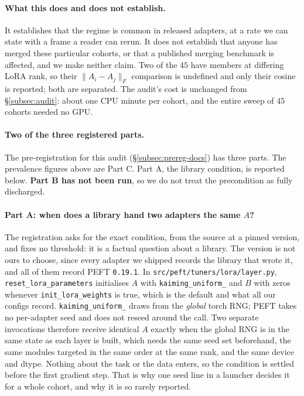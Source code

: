 \paragraph{What this does and does not establish.} It establishes that the
regime is common in released adapters, at a rate we can state with a frame a
reader can rerun. It does not establish that anyone has merged these particular
cohorts, or that a published merging benchmark is affected, and we make neither
claim. Two of the $45$ have members at differing LoRA rank, so their
$\|A_i - A_j\|_F$ comparison is undefined and only their cosine is reported;
both are separated. The audit's cost is unchanged from
\S\ref{subsec:audit}: about one CPU minute per cohort, and the entire sweep of
$45$ cohorts needed no GPU.

\paragraph{Two of the three registered parts.} The
pre-registration for this audit (\S\ref{subsec:prereg-docs}) has three parts.
The prevalence figures above are Part C. Part A, the library condition, is
reported below. \textbf{Part B has not been run}, so we do not treat the
precondition as fully discharged.

\paragraph{Part A: when does a library hand two adapters the same $A$?} The
registration asks for the exact condition, from the source at a pinned
version, and fixes no threshold: it is a factual question about a library. The
version is not ours to choose, since every adapter we shipped records the
library that wrote it, and all of them record PEFT \texttt{0.19.1}. In
\texttt{src/peft/tuners/lora/layer.py}, \texttt{reset\_lora\_parameters}
initialises $A$ with \texttt{kaiming\_uniform\_} and $B$ with zeros whenever
\texttt{init\_lora\_weights} is true, which is the default and what all our
configs record. \texttt{kaiming\_uniform\_} draws from the \emph{global} torch
RNG; PEFT takes no per-adapter seed and does not reseed around the call. Two
separate invocations therefore receive identical $A$ exactly when the global
RNG is in the same state as each layer is built, which needs the same seed set
beforehand, the same modules targeted in the same order at the same rank, and
the same device and dtype. Nothing about the task or the data enters, so the
condition is settled before the first gradient step. That is why one seed line
in a launcher decides it for a whole cohort, and why it is so rarely reported.

